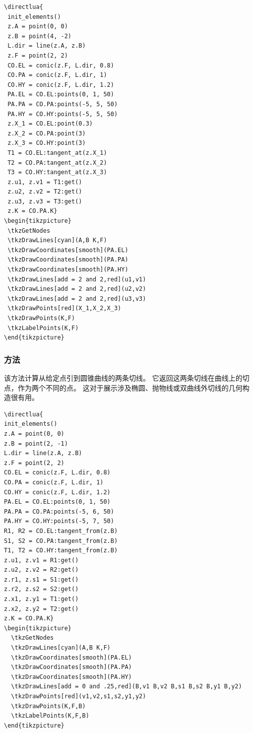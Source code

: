 \begin{verbatim}
\directlua{
 init_elements()
 z.A = point(0, 0)
 z.B = point(4, -2)
 L.dir = line(z.A, z.B)
 z.F = point(2, 2)
 CO.EL = conic(z.F, L.dir, 0.8)
 CO.PA = conic(z.F, L.dir, 1)
 CO.HY = conic(z.F, L.dir, 1.2)
 PA.EL = CO.EL:points(0, 1, 50)
 PA.PA = CO.PA:points(-5, 5, 50)
 PA.HY = CO.HY:points(-5, 5, 50)
 z.X_1 = CO.EL:point(0.3)
 z.X_2 = CO.PA:point(3)
 z.X_3 = CO.HY:point(3)
 T1 = CO.EL:tangent_at(z.X_1)
 T2 = CO.PA:tangent_at(z.X_2)
 T3 = CO.HY:tangent_at(z.X_3)
 z.u1, z.v1 = T1:get()
 z.u2, z.v2 = T2:get()
 z.u3, z.v3 = T3:get()
 z.K = CO.PA.K}
\begin{tikzpicture}
 \tkzGetNodes
 \tkzDrawLines[cyan](A,B K,F)
 \tkzDrawCoordinates[smooth](PA.EL)
 \tkzDrawCoordinates[smooth](PA.PA)
 \tkzDrawCoordinates[smooth](PA.HY)
 \tkzDrawLines[add = 2 and 2,red](u1,v1)
 \tkzDrawLines[add = 2 and 2,red](u2,v2)
 \tkzDrawLines[add = 2 and 2,red](u3,v3)
 \tkzDrawPoints[red](X_1,X_2,X_3)
 \tkzDrawPoints(K,F)
 \tkzLabelPoints(K,F)
\end{tikzpicture}
\end{verbatim}

\subsubsection{方法 }
\label{ssub:method_conic_tangent_from}

该方法计算从给定点引到圆锥曲线的两条切线。
它返回这两条切线在曲线上的切点，作为两个不同的点。
这对于展示涉及椭圆、抛物线或双曲线外切线的几何构造很有用。

\vspace{1em}

\begin{verbatim}
\directlua{
init_elements()
z.A = point(0, 0)
z.B = point(2, -1)
L.dir = line(z.A, z.B)
z.F = point(2, 2)
CO.EL = conic(z.F, L.dir, 0.8)
CO.PA = conic(z.F, L.dir, 1)
CO.HY = conic(z.F, L.dir, 1.2)
PA.EL = CO.EL:points(0, 1, 50)
PA.PA = CO.PA:points(-5, 6, 50)
PA.HY = CO.HY:points(-5, 7, 50)
R1, R2 = CO.EL:tangent_from(z.B)
S1, S2 = CO.PA:tangent_from(z.B)
T1, T2 = CO.HY:tangent_from(z.B)
z.u1, z.v1 = R1:get()
z.u2, z.v2 = R2:get()
z.r1, z.s1 = S1:get()
z.r2, z.s2 = S2:get()
z.x1, z.y1 = T1:get()
z.x2, z.y2 = T2:get()
z.K = CO.PA.K}
\begin{tikzpicture}
  \tkzGetNodes
  \tkzDrawLines[cyan](A,B K,F)
  \tkzDrawCoordinates[smooth](PA.EL)
  \tkzDrawCoordinates[smooth](PA.PA)
  \tkzDrawCoordinates[smooth](PA.HY)
  \tkzDrawLines[add = 0 and .25,red](B,v1 B,v2 B,s1 B,s2 B,y1 B,y2)
  \tkzDrawPoints[red](v1,v2,s1,s2,y1,y2)
  \tkzDrawPoints(K,F,B)
  \tkzLabelPoints(K,F,B)
\end{tikzpicture}
\end{verbatim}

